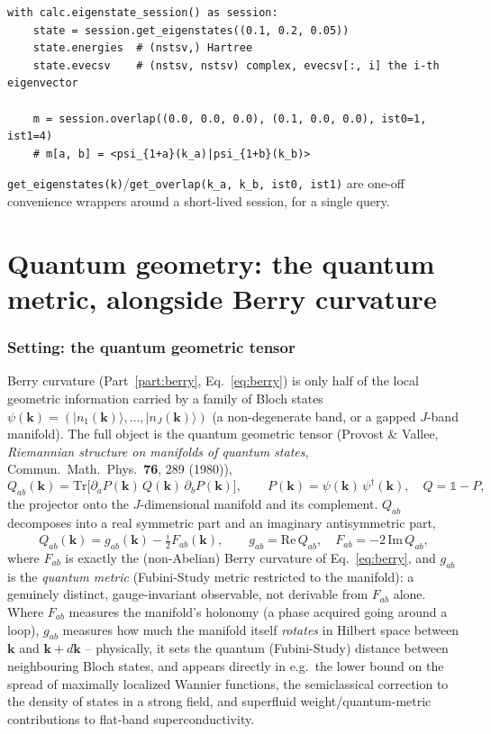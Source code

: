 \documentclass[11pt]{article}
\begin{document}
\begin{verbatim}
with calc.eigenstate_session() as session:
    state = session.get_eigenstates((0.1, 0.2, 0.05))
    state.energies  # (nstsv,) Hartree
    state.evecsv    # (nstsv, nstsv) complex, evecsv[:, i] the i-th eigenvector

    m = session.overlap((0.0, 0.0, 0.0), (0.1, 0.0, 0.0), ist0=1, ist1=4)
    # m[a, b] = <psi_{1+a}(k_a)|psi_{1+b}(k_b)>
\end{verbatim}
\texttt{get\_eigenstates(k)}/\texttt{get\_overlap(k\_a, k\_b, ist0, ist1)} are one-off
convenience wrappers around a short-lived session, for a single query.

\part{Quantum geometry: the quantum metric, alongside Berry curvature}
\label{part:quantumgeometry}

\section{Setting: the quantum geometric tensor}

Berry curvature (Part~\ref{part:berry}, Eq.~\eqref{eq:berry}) is only half of the local
geometric information carried by a family of Bloch states $\psi(\mathbf k) =
(|n_1(\mathbf k)\rangle,\dots,|n_J(\mathbf k)\rangle)$ (a non-degenerate band, or a gapped
$J$-band manifold). The full object is the quantum geometric tensor (Provost \& Vallee,
\emph{Riemannian structure on manifolds of quantum states}, Commun.\ Math.\ Phys.\
\textbf{76}, 289 (1980)),
\begin{equation}
  Q_{ab}(\mathbf k) = \mathrm{Tr}\bigl[\partial_a P(\mathbf k)\, Q(\mathbf k)\,
    \partial_b P(\mathbf k)\bigr], \qquad
  P(\mathbf k) = \psi(\mathbf k)\,\psi^\dagger(\mathbf k), \quad Q = \mathbb 1 - P,
  \label{eq:qgt}
\end{equation}
the projector onto the $J$-dimensional manifold and its complement. $Q_{ab}$ decomposes
into a real symmetric part and an imaginary antisymmetric part,
\begin{equation}
  Q_{ab}(\mathbf k) = g_{ab}(\mathbf k) - \tfrac{i}{2} F_{ab}(\mathbf k), \qquad
  g_{ab} = \mathrm{Re}\,Q_{ab}, \quad F_{ab} = -2\,\mathrm{Im}\,Q_{ab},
  \label{eq:qgt-decomp}
\end{equation}
where $F_{ab}$ is exactly the (non-Abelian) Berry curvature of Eq.~\eqref{eq:berry}, and
$g_{ab}$ is the \emph{quantum metric} (Fubini-Study metric restricted to the manifold): a
genuinely distinct, gauge-invariant observable, not derivable from $F_{ab}$ alone. Where
$F_{ab}$ measures the manifold's holonomy (a phase acquired going around a loop),
$g_{ab}$ measures how much the manifold itself \emph{rotates} in Hilbert space between
$\mathbf k$ and $\mathbf k+d\mathbf k$ -- physically, it sets the quantum (Fubini-Study)
distance between neighbouring Bloch states, and appears directly in e.g.\ the
lower bound on the spread of maximally localized Wannier functions, the semiclassical
correction to the density of states in a strong field, and superfluid weight/quantum-metric
contributions to flat-band superconductivity.
\end{document}
